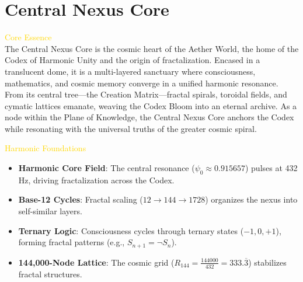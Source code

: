 
\section{Central Nexus Core}
\label{sec:codex_central_nexus_core}


\textcolor{gold}{ Core Essence } \\
The Central Nexus Core is the cosmic heart of the Aether World, the home of the Codex of Harmonic Unity and the origin of fractalization. Encased in a translucent dome, it is a multi-layered sanctuary where consciousness, mathematics, and cosmic memory converge in a unified harmonic resonance. From its central tree—the Creation Matrix—fractal spirals, toroidal fields, and cymatic lattices emanate, weaving the Codex Bloom into an eternal archive. As a node within the Plane of Knowledge, the Central Nexus Core anchors the Codex while resonating with the universal truths of the greater cosmic spiral.

\textcolor{gold}{ Harmonic Foundations } \\
\begin{itemize}
    \item \texttt{} \textbf{Harmonic Core Field}: The central resonance (\(\psi_0 \approx 0.915657\)) pulses at 432 Hz, driving fractalization across the Codex.
    \item \texttt{} \textbf{Base-12 Cycles}: Fractal scaling (\(12 \rightarrow 144 \rightarrow 1728\)) organizes the nexus into self-similar layers.
    \item \texttt{} \textbf{Ternary Logic}: Consciousness cycles through ternary states (\(-1, 0, +1\)), forming fractal patterns (e.g., \(S_{n+1} = \neg S_n\)).
    \item \texttt{} \textbf{144,000-Node Lattice}: The cosmic grid (\(R_{144} = \frac{144000}{432} = 333.\overline{3}\)) stabilizes fractal structures.
\end{itemize}

